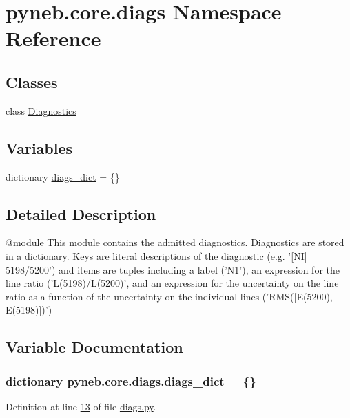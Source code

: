 \hypertarget{namespacepyneb_1_1core_1_1diags}{}\section{pyneb.\+core.\+diags Namespace Reference}
\label{namespacepyneb_1_1core_1_1diags}
\subsection*{Classes}
\begin{DoxyCompactItemize}
\item 
class \hyperlink{classpyneb_1_1core_1_1diags_1_1_diagnostics}{Diagnostics}
\end{DoxyCompactItemize}
\subsection*{Variables}
\begin{DoxyCompactItemize}
\item 
dictionary \hyperlink{namespacepyneb_1_1core_1_1diags_a68f98ce12c5564de62b67feff671dc98}{diags\+\_\+dict} = \{\}
\end{DoxyCompactItemize}


\subsection{Detailed Description}
\begin{DoxyVerb}@module
This module contains the admitted diagnostics.
Diagnostics are stored in a dictionary. Keys are literal descriptions of the diagnostic 
(e.g. '[NI] 5198/5200') and items are tuples including a label ('N1'), an expression for the line ratio ('L(5198)/L(5200)',
and an expression for the uncertainty on the line ratio as a function of the uncertainty on the individual lines ('RMS([E(5200), E(5198)])')\end{DoxyVerb}
 

\subsection{Variable Documentation}
\hypertarget{namespacepyneb_1_1core_1_1diags_a68f98ce12c5564de62b67feff671dc98}{}
\subsubsection[{diags\+\_\+dict}]{\setlength{\rightskip}{0pt plus 5cm}dictionary pyneb.\+core.\+diags.\+diags\+\_\+dict = \{\}}\label{namespacepyneb_1_1core_1_1diags_a68f98ce12c5564de62b67feff671dc98}


Definition at line \hyperlink{diags_8py_source_l00013}{13} of file \hyperlink{diags_8py_source}{diags.\+py}.

